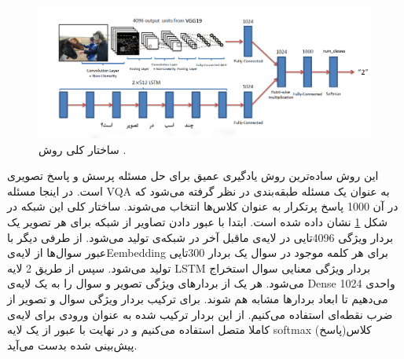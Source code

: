 {	\subsection{ \cite{antol2015vqa}}
	{
		\begin{figure}
			\centering
			\includegraphics[scale=0.4]{images/Vanilla_Network.jpg}
			\caption{ساختار کلی روش   .}
			\label{fig:3}
		\end{figure}
		این روش ساده‌ترین روش یادگیری عمیق برای حل مسئله پرسش و پاسخ تصویری است. در اینجا مسئله VQA به عنوان یک مسئله طبقه‌بندی در نظر گرفته می‌شود که در آن 1000 پاسخ پرتکرار به عنوان کلاس‌ها انتخاب می‌شوند.  ساختار کلی این شبکه در شکل 
		\ref{fig:3}
		نشان داده شده است. ابتدا با عبور دادن تصاویر از شبکه 
		 برای هر تصویر یک بردار ویژگی 4096تایی در لایه‌ی ماقبل آخر در شبکه‌ی
		   تولید می‌شود. از طرفی دیگر با عبور سوال‌ها از لایه‌یEembedding برای هر کلمه موجود در سوال یک بردار 300تایی تولید می‌شود. سپس از طریق 2 لایه LSTM بردار ویژگی معنایی سوال استخراج  می‌شود. هر یک از بردارهای ویژگی تصویر و سوال را به یک لایه‌ی Dense  1024 واحدی می‌دهیم تا ابعاد بردار‌ها مشابه هم شوند. برای ترکیب بردار ویژگی سوال و تصویر از ضرب نقطه‌ای استفاده می‌کنیم. از این بردار ترکیب شده به عنوان ورودی برای لایه‌ی کاملا متصل استفاده می‌کنیم و در نهایت با عبور از یک لایه softmax کلاس(پاسخ) پیش‌بینی شده بدست می‌آید.
	}

}
